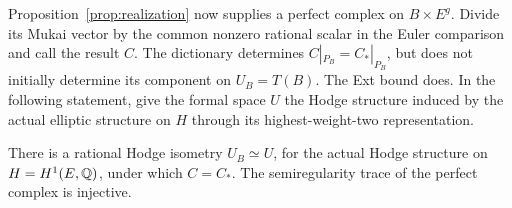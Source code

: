 Proposition~\ref{prop:realization} now supplies a perfect
complex on $B\times E^g$.  Divide its Mukai vector by the
common nonzero rational scalar in the Euler comparison and
call the result $C$.  The dictionary determines
$C|_{P_B}=C_*|_{P_B}$, but does not initially determine
its component on $U_B=T(B)$.  The Ext bound does.  In the
following statement, give the formal space $U$ the Hodge
structure induced by the actual elliptic structure on $H$
through its highest-weight-two representation.

\begin{lemma}
 \label{ks:exactness}
There is a rational Hodge isometry $U_B\simeq U$, for the
actual Hodge structure on $H=H^1(E,\mathbb Q)$, under which
$C=C_*$.  The semiregularity trace of the perfect complex
is injective.
\end{lemma}

